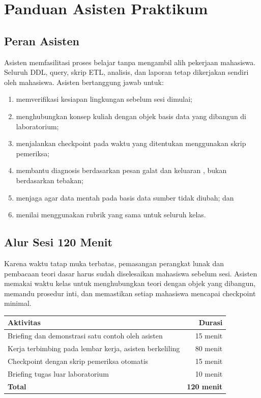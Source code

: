 \chapter{Panduan Asisten Praktikum}

\section{Peran Asisten}

Asisten memfasilitasi proses belajar tanpa mengambil alih pekerjaan mahasiswa.
Seluruh DDL, query, skrip ETL, analisis, dan laporan tetap dikerjakan sendiri
oleh mahasiswa. Asisten bertanggung jawab untuk:

\begin{enumerate}[leftmargin=1.4em]
  \item memverifikasi kesiapan lingkungan sebelum sesi dimulai;
  \item menghubungkan konsep kuliah dengan objek basis data yang dibangun di
        laboratorium;
  \item menjalankan checkpoint pada waktu yang ditentukan menggunakan skrip
        pemeriksa;
  \item membantu diagnosis berdasarkan pesan galat dan keluaran
        , bukan berdasarkan tebakan;
  \item menjaga agar data mentah pada basis data sumber tidak diubah; dan
  \item menilai menggunakan rubrik yang sama untuk seluruh kelas.
\end{enumerate}

\section{Alur Sesi 120 Menit}

Karena waktu tatap muka terbatas, pemasangan perangkat lunak dan pembacaan
teori dasar harus sudah diselesaikan mahasiswa sebelum sesi. Asisten memakai
waktu kelas untuk menghubungkan teori dengan objek yang dibangun, memandu
prosedur inti, dan memastikan setiap mahasiswa mencapai checkpoint minimal.

\begin{center}
\small
\begin{tabular}{@{}p{}r@{}}
\toprule
\textbf{Aktivitas} & \textbf{Durasi} \\
\midrule
Briefing dan demonstrasi satu contoh oleh asisten & 15 menit \\
Kerja terbimbing pada lembar kerja, asisten berkeliling & 80 menit \\
Checkpoint dengan skrip pemeriksa otomatis & 15 menit \\
Briefing tugas luar laboratorium & 10 menit \\
\midrule
\textbf{Total} & \textbf{120 menit} \\
\bottomrule
\end{tabular}
\end{center}

